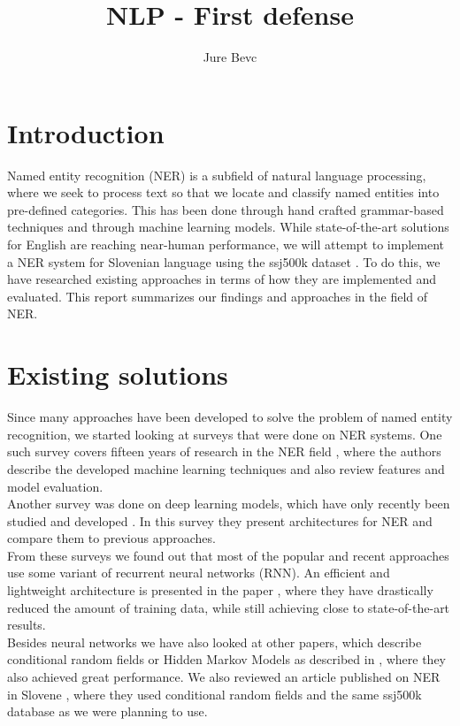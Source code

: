 \documentclass[11pt,a4paper]{article}
\title{NLP - First defense}
\author{
Jure Bevc
}
\date{}
\begin{document}
\maketitle

\section{Introduction}
Named entity recognition (NER) is a subfield of natural language processing, where we seek to process text so that we locate and classify named entities into pre-defined categories. This has been done through hand crafted grammar-based techniques and through machine learning models. While state-of-the-art solutions for English are reaching near-human performance, we will attempt to implement a NER system for Slovenian language using the ssj500k dataset \cite{dataset}. To do this, we have researched existing approaches in terms of how they are implemented and evaluated. This report summarizes our findings and approaches in the field of NER.

\section{Existing solutions}

Since many approaches have been developed to solve the problem of named entity recognition, we started looking at surveys that were done on NER systems. One such survey covers fifteen years of research in the NER field \cite{nadeau2007survey}, where the authors describe the developed machine learning techniques and also review features and model evaluation.\\
Another survey was done on deep learning models, which have only recently been studied and developed \cite{yadav2019survey}. In this survey they present architectures for NER and compare them to previous approaches.\\

From these surveys we found out that most of the popular and recent approaches use some variant of recurrent neural networks (RNN). An efficient and lightweight architecture is presented in the paper \cite{shen2017deep}, where they have drastically reduced the amount of training data, while still achieving close to state-of-the-art results.\\

Besides neural networks we have also looked at other papers, which describe conditional random fields or Hidden Markov
Models as described in \cite{HMM}, where they also achieved great performance. We also reviewed an article published on NER in Slovene \cite{Stajner_Erjavec_Krek_2013}, where they used conditional random fields and the same ssj500k database as we were planning to use.
\end{document}
